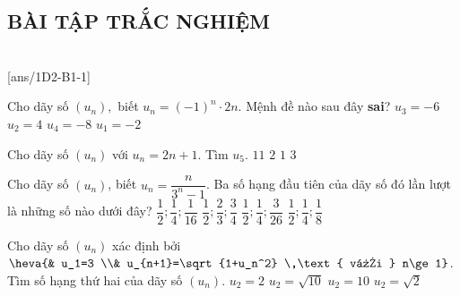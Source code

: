 \subsection{BÀI TẬP TRẮC NGHIỆM}
 \\
\setcounter{ex}{0}
[ans/1D2-B1-1]
\begin{ex}%
	Cho dãy số $({{u}_{n}} ),$ biết ${{u}_{n}}={{(-1 )}^{n}}\cdot 2n$. Mệnh đề nào sau đây {\bf sai}?
	\choice
	{${{u}_{3}}=-6$}
	{${{u}_{2}}=4$}
	{ \True ${{u}_{4}}=-8$}
	{${{u}_{1}}=-2$}
\end{ex}

\begin{ex}%
	Cho dãy số $(u_n)$ với $u_n=2n+1$. Tìm $u_5$.
	\choice
	{ \True $11$}
	{ $2$}
	{ $1$} 
	{ $3$}
\end{ex}


\begin{ex}%
	Cho dãy số $({{u}_{n}} )$, biết ${{u}_{n}}=\dfrac{n}{{{3}^{n}}-1}$. Ba số hạng đầu tiên của dãy số đó lần lượt là những số nào dưới đây?
	\choice
	{$\dfrac{1}{2};\dfrac{1}{4};\dfrac{1}{16}$}
	{$\dfrac{1}{2};\dfrac{2}{3};\dfrac{3}{4}$}
	{ \True $\dfrac{1}{2};\dfrac{1}{4};\dfrac{3}{26}$}
	{$\dfrac{1}{2};\dfrac{1}{4};\dfrac{1}{8}$}
\end{ex}


\begin{ex}%
	Cho dãy số $\left(u_n\right)$ xác định bởi $\heva{& u_1=3 \\& u_{n+1}=\sqrt{1+u_n^2} \,\text{ với } n\ge 1}$. Tìm số hạng thứ hai của dãy số $\left(u_n\right)$.
	\choice
	{$u_2=2$}
	{\True $u_2=\sqrt{10}$}
	{$u_2=10$}
	{$u_2=\sqrt{2}$}
\end{ex}

